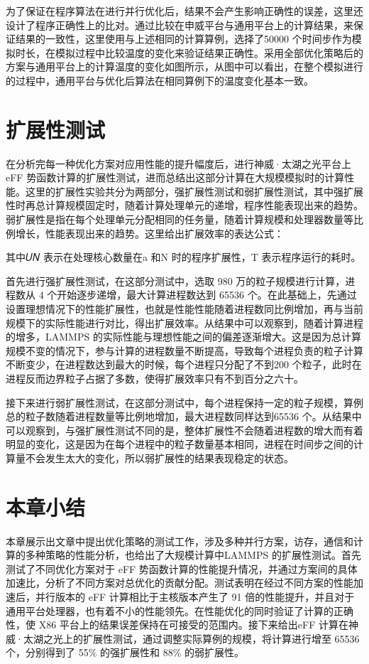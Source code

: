 为了保证在程序算法在进行并行优化后，结果不会产生影响正确性的误差，这里还设计了程序正确性上的比对。通过比较在申威平台与通用平台上的计算结果，来保证结果的一致性，这里使用与上述相同的计算算例，选择了50000 个时间步作为模拟时长，在模拟过程中比较温度的变化来验证结果正确性。采用全部优化策略后的方案与通用平台上的计算温度的变化如图所示，从图中可以看出，在整个模拟进行的过程中，通用平台与优化后算法在相同算例下的温度变化基本一致。

\section{扩展性测试}
在分析完每一种优化方案对应用性能的提升幅度后，进行神威·太湖之光平台上 eFF 势函数计算的扩展性测试，进而总结出这部分计算在大规模模拟时的计算性能。这里的扩展性实验共分为两部分，强扩展性测试和弱扩展性测试，其中强扩展性时再总计算规模固定时，随着计算处理单元的递增，程序性能表现出来的趋势。弱扩展性是指在每个处理单元分配相同的任务量，随着计算规模和处理器数量等比例增长，性能表现出来的趋势。这里给出扩展效率的表达公式：

其中𝑈𝑁 表示在处理核心数量在a 和N 时的程序扩展性，T 表示程序运行的耗时。

首先进行强扩展性测试，在这部分测试中，选取 980 万的粒子规模进行计算，进程数从 4 个开始逐步递增，最大计算进程数达到 65536 个。在此基础上，先通过设置理想情况下的性能扩展性，也就是性能性能随着进程数同比例增加，再与当前规模下的实际性能进行对比，得出扩展效率。从结果中可以观察到，随着计算进程的增多，LAMMPS 的实际性能与理想性能之间的偏差逐渐增大。这是因为总计算规模不变的情况下，参与计算的进程数量不断提高，导致每个进程负责的粒子计算不断变少，在进程数达到最大的时候，每个进程只分配了不到200 个粒子，此时在进程反而边界粒子占据了多数，使得扩展效率只有不到百分之六十。

接下来进行弱扩展性测试，在这部分测试中，每个进程保持一定的粒子规模，算例总的粒子数随着进程数量等比例地增加，最大进程数同样达到65536 个。从结果中可以观察到，与强扩展性测试不同的是，整体扩展性不会随着进程数的增大而有着明显的变化，这是因为在每个进程中的粒子数量基本相同，进程在时间步之间的计算量不会发生太大的变化，所以弱扩展性的结果表现稳定的状态。

\section{本章小结}
本章展示出文章中提出优化策略的测试工作，涉及多种并行方案，访存，通信和计算的多种策略的性能分析，也给出了大规模计算中LAMMPS 的扩展性测试。首先测试了不同优化方案对于 eFF 势函数计算的性能提升情况，并通过方案间的具体加速比，分析了不同方案对总优化的贡献分配。测试表明在经过不同方案的性能加速后，并行版本的 eFF 计算相比于主核版本产生了 91 倍的性能提升，并且对于通用平台处理器，也有着不小的性能领先。在性能优化的同时验证了计算的正确性，使 X86 平台上的结果误差保持在可接受的范围内。接下来给出eFF 计算在神威·太湖之光上的扩展性测试，通过调整实际算例的规模，将计算进行增至 65536 个，分别得到了 55\% 的强扩展性和 88\% 的弱扩展性。
